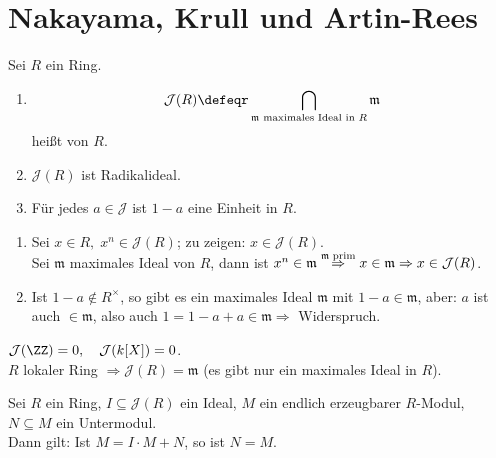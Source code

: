 \section{Nakayama, Krull und Artin-Rees}

\begin{DefBem}

Sei $R$ ein Ring.
\begin{enumerate}
	\item $$\mathcal{J}(R) \defeqr \bigcap_{\mathfrak{m}\text{\scriptsize\ maximales Ideal in }R}\mathfrak{m}$$ heißt  von $R$.
	\item $\mathcal{J}(R)$ ist Radikalideal.
	\item Für jedes $a \in \mathcal{J}$ ist $1-a$ eine Einheit in $R$.
\end{enumerate}

\end{DefBem}

\begin{Bew}

\begin{enumerate}
	\item Sei $x \in R, \; x^n \in \mathcal{J}(R)$; zu zeigen: $x \in \mathcal{J}(R)$.\\
	Sei $\mathfrak{m}$ maximales Ideal von $R$, dann ist $x^n \in \mathfrak{m}
	\overset{\mathfrak{m} \; \text{\scriptsize prim}}{\Rightarrow} x \in
	\mathfrak{m} \Rightarrow x \in \mathcal{J}(R)$.
	\item Ist $1-a \notin R^{\times}$, so gibt es ein maximales Ideal
	$\mathfrak{m}$ mit $1-a \in \mathfrak{m}$, aber: $a$ ist auch $\in
	\mathfrak{m}$, also auch $1 = 1-a+a \in \mathfrak{m} \Rightarrow$ Widerspruch.
\end{enumerate}
\end{Bew}

\begin{nnBsp}
  $\mathcal{J}(\ZZ) = 0, \quad \mathcal{J}(k[X]) = 0$.\\
  $R$ lokaler Ring $\Rightarrow \mathcal{J}(R) = \mathfrak{m}$ (es gibt nur ein
  maximales Ideal in $R$).
\end{nnBsp}

\begin{Satz}
\label{Satz8}
  Sei $R$ ein Ring, $I \subseteq \mathcal{J}(R)$ ein Ideal, $M$ ein endlich erzeugbarer $R$-Modul, $N \subseteq M$ ein Untermodul.\\
  Dann gilt: Ist $M = I \cdot M + N$, so ist $N = M$.
\end{Satz}


